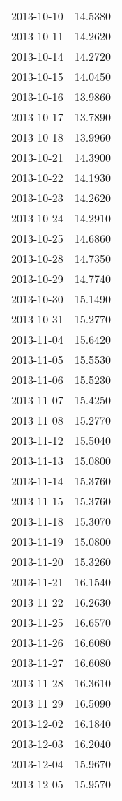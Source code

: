 \begin{tabular}{lr}
2013-10-10 &     14.5380 \\
2013-10-11 &     14.2620 \\
2013-10-14 &     14.2720 \\
2013-10-15 &     14.0450 \\
2013-10-16 &     13.9860 \\
2013-10-17 &     13.7890 \\
2013-10-18 &     13.9960 \\
2013-10-21 &     14.3900 \\
2013-10-22 &     14.1930 \\
2013-10-23 &     14.2620 \\
2013-10-24 &     14.2910 \\
2013-10-25 &     14.6860 \\
2013-10-28 &     14.7350 \\
2013-10-29 &     14.7740 \\
2013-10-30 &     15.1490 \\
2013-10-31 &     15.2770 \\
2013-11-04 &     15.6420 \\
2013-11-05 &     15.5530 \\
2013-11-06 &     15.5230 \\
2013-11-07 &     15.4250 \\
2013-11-08 &     15.2770 \\
2013-11-12 &     15.5040 \\
2013-11-13 &     15.0800 \\
2013-11-14 &     15.3760 \\
2013-11-15 &     15.3760 \\
2013-11-18 &     15.3070 \\
2013-11-19 &     15.0800 \\
2013-11-20 &     15.3260 \\
2013-11-21 &     16.1540 \\
2013-11-22 &     16.2630 \\
2013-11-25 &     16.6570 \\
2013-11-26 &     16.6080 \\
2013-11-27 &     16.6080 \\
2013-11-28 &     16.3610 \\
2013-11-29 &     16.5090 \\
2013-12-02 &     16.1840 \\
2013-12-03 &     16.2040 \\
2013-12-04 &     15.9670 \\
2013-12-05 &     15.9570 \\

\end{tabular}
